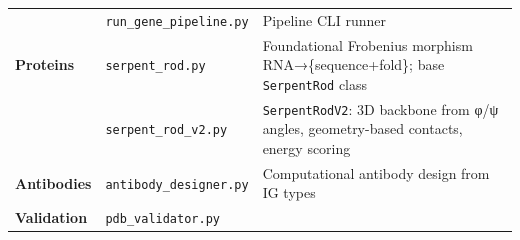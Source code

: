 \documentclass[12pt,a4paper]{article}
\begin{document}
\begin{longtable}[]{@{}lll@{}}
\begin{minipage}[t]{0.23\columnwidth}\raggedright
\strut
\end{minipage} & \begin{minipage}[t]{0.26\columnwidth}\raggedright
\texttt{run\_gene\_pipeline.py}\strut
\end{minipage} & \begin{minipage}[t]{0.42\columnwidth}\raggedright
Pipeline CLI runner\strut
\end{minipage}\tabularnewline
\begin{minipage}[t]{0.23\columnwidth}\raggedright
\textbf{Proteins}\strut
\end{minipage} & \begin{minipage}[t]{0.26\columnwidth}\raggedright
\texttt{serpent\_rod.py}\strut
\end{minipage} & \begin{minipage}[t]{0.42\columnwidth}\raggedright
Foundational Frobenius morphism RNA→\{sequence+fold\}; base
\texttt{SerpentRod} class\strut
\end{minipage}\tabularnewline
\begin{minipage}[t]{0.23\columnwidth}\raggedright
\strut
\end{minipage} & \begin{minipage}[t]{0.26\columnwidth}\raggedright
\texttt{serpent\_rod\_v2.py}\strut
\end{minipage} & \begin{minipage}[t]{0.42\columnwidth}\raggedright
\texttt{SerpentRodV2}: 3D backbone from φ/ψ angles, geometry-based
contacts, energy scoring\strut
\end{minipage}\tabularnewline
\begin{minipage}[t]{0.23\columnwidth}\raggedright
\textbf{Antibodies}\strut
\end{minipage} & \begin{minipage}[t]{0.26\columnwidth}\raggedright
\texttt{antibody\_designer.py}\strut
\end{minipage} & \begin{minipage}[t]{0.42\columnwidth}\raggedright
Computational antibody design from IG types\strut
\end{minipage}\tabularnewline
\begin{minipage}[t]{0.23\columnwidth}\raggedright
\textbf{Validation}\strut
\end{minipage} & \begin{minipage}[t]{0.26\columnwidth}\raggedright
\texttt{pdb\_validator.py}\strut
\end{minipage} & \begin{minipage}[t]{0.42\columnwidth}\raggedright

\end{minipage}
\end{longtable}
\end{document}
